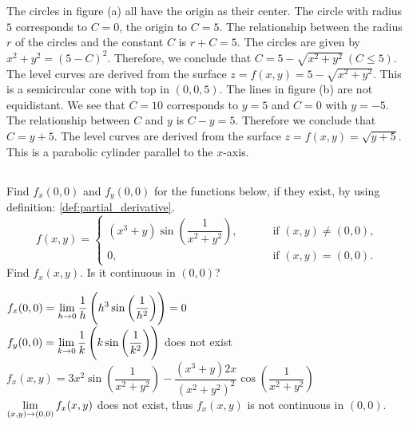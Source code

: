 \begin{Answer}
    
        \Question The circles in figure (a) all have the origin as their center. The circle with radius $5$ corresponds to $C=0$, the origin to $C=5$. The relationship between the radius $r$ of the circles and the constant $C$ is $r+C=5$. The circles are given by $x^2+y^2 = (5-C)^2$. Therefore, we conclude that $C=5-\sqrt{x^2+y^2} \ (C \leq 5)$. The level curves are derived from the surface $z=f(x,y)=5-\sqrt{x^2+y^2}$. This is a semicircular cone with top in $(0,0,5)$.
        \Question The lines in figure (b) are not equidistant. We see that $C=10$ corresponds to $y=5$ and $C=0$ with $y=-5$. The relationship between $C$ and $y$ is $C-y=5$. Therefore we conclude that $C=y+5$. The level curves are derived from the surface $z=f(x,y)=\sqrt{y+5}$. This is a parabolic cylinder parallel to the $x$-axis.
    
\end{Answer}

\pagebreak\fi
\subsection*{}
\ifanalysis
\begin{Exercise}[difficulty = 2] Find $f_x(0,0)$ and $f_y(0,0)$ for the functions below, if they exist, by using definition: \ref{def:partial_derivative}. 
\[ f(x,y) = \left\{\begin{array}{ll} (x^3+y) \sin \left(\dfrac{1}{x^2+y^2} \right), \quad & \quad \text{ if } (x,y) \neq (0,0), \\
0, &\quad \text{ if } (x,y) = (0,0). \end{array} \right. \]
Find $f_x(x,y)$. Is it continuous in $(0,0)$?
\end{Exercise}

\begin{Answer}

    $f_x(0,0) = \displaystyle \lim_{h \to 0} \dfrac{1}{h} \left(h^3 \sin \left( \dfrac{1}{h^2} \right)  \right) = 0$\\[0.2cm]
    $f_y(0,0) = \displaystyle \lim_{k \to 0} \dfrac{1}{k} \left(k \sin \left( \dfrac{1}{k^2} \right)  \right)$ does not exist \\[0.2cm]
    $f_x(x,y) = 3 x^2 \sin \left( \dfrac{1}{x^2+y^2} \right) - \dfrac{(x^3+y)2x}{\left(x^2+y^2\right)^2} \cos\left( \dfrac{1}{x^2+y^2} \right)$ \\[0.2cm]
    $\displaystyle \lim_{(x,y)\to (0,0)} f_x(x,y)$ does not exist, thus $f_x(x,y)$ is not continuous in $(0,0)$.
\end{Answer}

